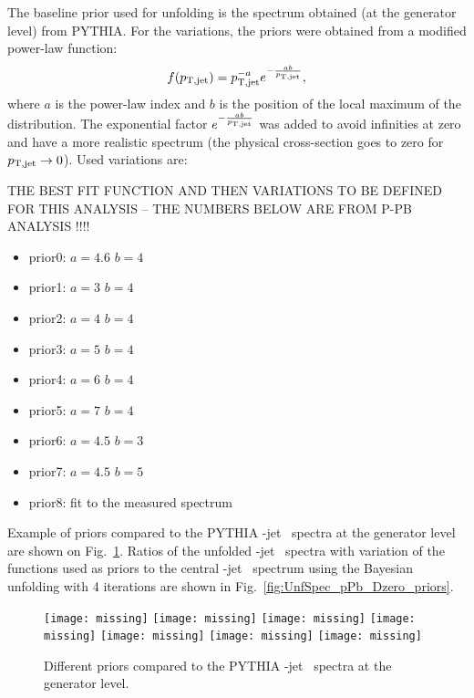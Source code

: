 The baseline prior used for unfolding is the spectrum obtained (at the generator level) from PYTHIA.
For the variations, the priors were obtained from a modified power-law function:
\begin{equation}
f(p_{\mathrm{T,jet}}) = p_{\mathrm{T,jet}}^{-a}e^{-\frac{ab}{p_{\mathrm{T,jet}}}},
\end{equation}
where $a$ is the power-law index and $b$ is the position of the local maximum of the distribution. The exponential factor $e^{-\frac{ab}{p_{\mathrm{T,jet}}}}$ was added to avoid infinities at zero and have a more realistic spectrum (the physical cross-section goes to zero for $p_{\mathrm{T,jet}} \to 0$).
Used variations are: {\color{red} THE BEST FIT FUNCTION AND THEN VARIATIONS TO BE DEFINED FOR THIS ANALYSIS -- THE NUMBERS BELOW ARE FROM P-PB ANALYSIS !!!!
\begin{itemize}
\item prior0: $a=4.6$ $b=4$~\GeVc\ 
\item prior1: $a=3$ $b=4$~\GeVc\
\item prior2: $a=4$ $b=4$~\GeVc\
\item prior3: $a=5$ $b=4$~\GeVc\
\item prior4: $a=6$ $b=4$~\GeVc\
\item prior5: $a=7$ $b=4$~\GeVc\
\item prior6: $a=4.5$ $b=3$~\GeVc\
\item prior7: $a=4.5$ $b=5$~\GeVc\
\item prior8: fit to the measured spectrum
\end{itemize}
}

Example of priors compared to the PYTHIA \Dzero-jet \pt\ spectra at the generator level are shown on Fig.~\ref{fig:UnfSpec_pPb_Dzero_priors_all}.
Ratios of the unfolded \Dzero-jet \pt\ spectra with variation of the functions used as priors to the central \Dzero-jet \pt\ spectrum using the Bayesian unfolding with 4 iterations are shown in Fig.~\ref{fig:UnfSpec_pPb_Dzero_priors}. 

\begin{figure}[bth]
\centering
\texttt{[image: missing]}
\texttt{[image: missing]}
\texttt{[image: missing]}
\texttt{[image: missing]}
\texttt{[image: missing]}
\texttt{[image: missing]}
\texttt{[image: missing]}
\caption{Different priors compared to the PYTHIA \Dzero-jet \pt\ spectra at the generator level.}
\label{fig:UnfSpec_pPb_Dzero_priors_all}
\end{figure}

